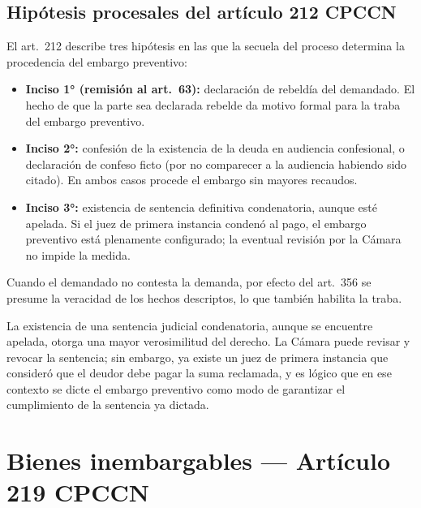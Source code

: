 \documentclass[12pt,oneside]{book}
\begin{document}
\subsection{Hipótesis procesales del artículo 212 CPCCN}

El art.\ 212 describe tres hipótesis en las que la secuela del proceso determina la procedencia del embargo preventivo:
\begin{itemize}
    \item \textbf{Inciso 1° (remisión al art.\ 63):} declaración de rebeldía del demandado. El hecho de que la parte sea declarada rebelde da motivo formal para la traba del embargo preventivo.
    \item \textbf{Inciso 2°:} confesión de la existencia de la deuda en audiencia confesional, o declaración de confeso ficto (por no comparecer a la audiencia habiendo sido citado). En ambos casos procede el embargo sin mayores recaudos.
    \item \textbf{Inciso 3°:} existencia de sentencia definitiva condenatoria, aunque esté apelada. Si el juez de primera instancia condenó al pago, el embargo preventivo está plenamente configurado; la eventual revisión por la Cámara no impide la medida.
\end{itemize}

\begin{note}
Cuando el demandado no contesta la demanda, por efecto del art.\ 356 se presume la veracidad de los hechos descriptos, lo que también habilita la traba. %
\end{note}

La existencia de una sentencia judicial condenatoria, aunque se encuentre apelada, otorga una mayor verosimilitud del derecho. La Cámara puede revisar y revocar la sentencia; sin embargo, ya existe un juez de primera instancia que consideró que el deudor debe pagar la suma reclamada, y es lógico que en ese contexto se dicte el embargo preventivo como modo de garantizar el cumplimiento de la sentencia ya dictada.

\section{Bienes inembargables --- Artículo 219 CPCCN}
\end{document}
